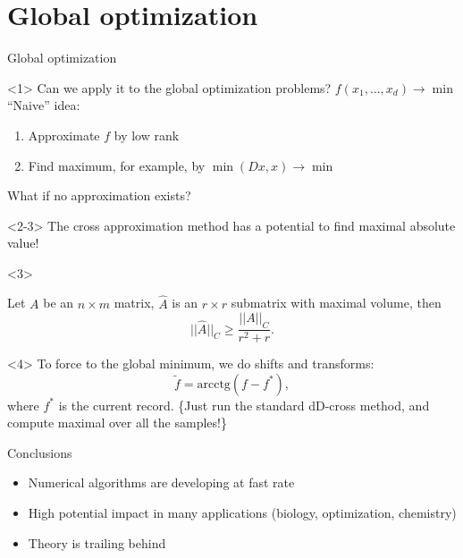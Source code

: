 \documentclass{beamer}[14pt, presentation]
\begin{document}
\section{Global optimization}
\label{sec-10}
\begin{frame}[label=sec-10-1]{Global optimization}
\begin{onlyenv}<1>
Can we apply it to the global optimization problems?
\vskip 2mm
 $f(x_1, \ldots, x_d) \rightarrow \min$
\vskip 2mm
``Naive'' idea:
\begin{enumerate}
\item Approximate $f$ by low rank
\item Find maximum, for example, by $\min (Dx, x) \rightarrow \min$
\end{enumerate}

What if \alert{no approximation exists?}
\end{onlyenv}

\begin{onlyenv}<2-3>
The cross approximation method has a potential to find maximal
absolute value!
\end{onlyenv}

\begin{onlyenv}<3>
\begin{theorem}{}
   Let $A$ be an $n \times m$ matrix, $\widehat{A}$ is an $r \times r$
   submatrix with maximal volume, then
   $$
       ||\widehat{A}||_C \geq \frac{ ||A||_C}{r^2 + r}. 
   $$
\end{theorem}
\end{onlyenv}
\begin{onlyenv}<4>
To force to the global minimum, we do shifts and transforms:
\begin{equation*}
   \widetilde{f} = \mathrm{arcctg}(f - f^* ),
\end{equation*}
where $f^*$ is the current record. 
\vskip 2mm
\alert\{Just run the standard dD-cross method, and compute maximal over all
the samples!\}
\end{onlyenv}
\end{frame}
\begin{frame}[label=sec-10-2]{Conclusions}
\begin{itemize}
\item Numerical algorithms are developing at fast rate
\item High potential impact in many applications (biology, optimization, chemistry)
\item Theory is trailing behind
\end{itemize}
\end{frame}
\end{document}
